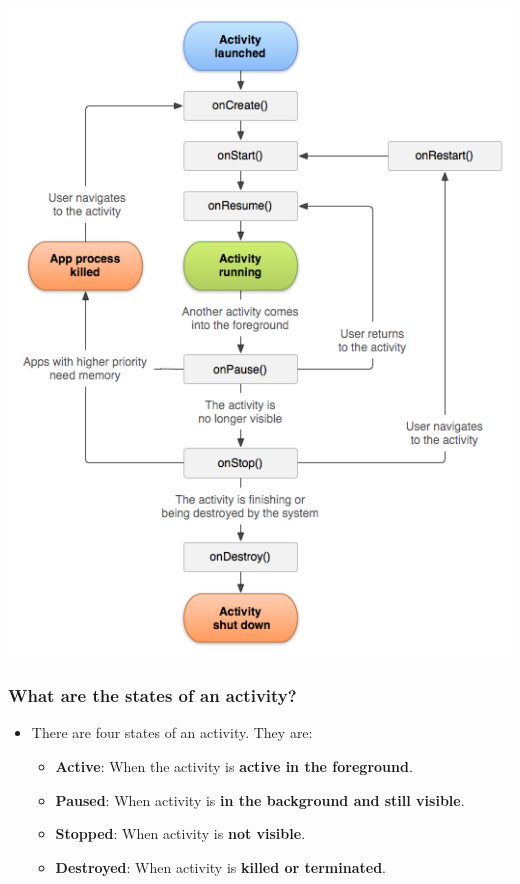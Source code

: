 \documentclass[9pt, b5paper]{article}
\begin{document}
\begin{itemize}
\includegraphics[width=.9\linewidth]{./pic/activityLifeCycle.png}
\end{itemize}
\subsubsection{What are the states of an activity?}
\label{sec-1-2-3}
\begin{itemize}
\item There are four states of an activity. They are:
\begin{itemize}
\item \textbf{Active}: When the activity is \textbf{active in the foreground}.
\item \textbf{Paused}: When activity is \textbf{in the background and still visible}.
\item \textbf{Stopped}: When activity is \textbf{not visible}.
\item \textbf{Destroyed}: When activity is \textbf{killed or terminated}.
\end{itemize}
\end{itemize}
\end{document}
